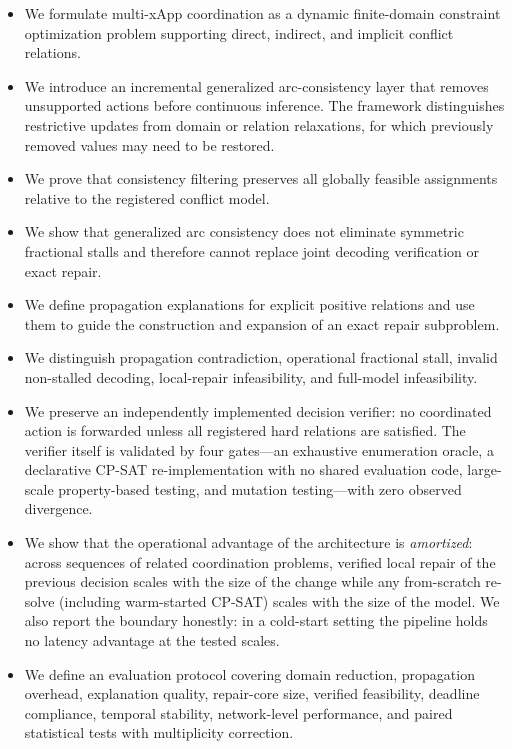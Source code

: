 \documentclass[pdflatex,sn-mathphys-num,iicol,oneside]{sn-jnl}
\begin{document}
\begin{itemize}
    \item We formulate multi-xApp coordination as a dynamic
    finite-domain constraint optimization problem supporting direct,
    indirect, and implicit conflict relations.

    \item We introduce an incremental generalized arc-consistency
    layer that removes unsupported actions before continuous
    inference. The framework distinguishes restrictive updates from
    domain or relation relaxations, for which previously removed
    values may need to be restored.

    \item We prove that consistency filtering preserves all globally
    feasible assignments relative to the registered conflict model.

    \item We show that generalized arc consistency does not eliminate
    symmetric fractional stalls and therefore cannot replace joint
    decoding verification or exact repair.

    \item We define propagation explanations for explicit positive
    relations and use them to guide the construction and expansion
    of an exact repair subproblem.

    \item We distinguish propagation contradiction, operational
    fractional stall, invalid non-stalled decoding, local-repair
    infeasibility, and full-model infeasibility.

    \item We preserve an independently implemented decision verifier:
    no coordinated action is forwarded unless all registered hard
    relations are satisfied. The verifier itself is validated by four
    gates---an exhaustive enumeration oracle, a declarative CP-SAT
    re-implementation with no shared evaluation code, large-scale
    property-based testing, and mutation testing---with zero observed
    divergence.

    \item We show that the operational advantage of the architecture is
    \emph{amortized}: across sequences of related coordination problems,
    verified local repair of the previous decision scales with the size
    of the change while any from-scratch re-solve (including warm-started
    CP-SAT) scales with the size of the model. We also report the
    boundary honestly: in a cold-start setting the pipeline holds no
    latency advantage at the tested scales.

    \item We define an evaluation protocol covering domain reduction,
    propagation overhead, explanation quality, repair-core size,
    verified feasibility, deadline compliance, temporal stability,
    network-level performance, and paired statistical tests with
    multiplicity correction.
\end{itemize}
\end{document}
